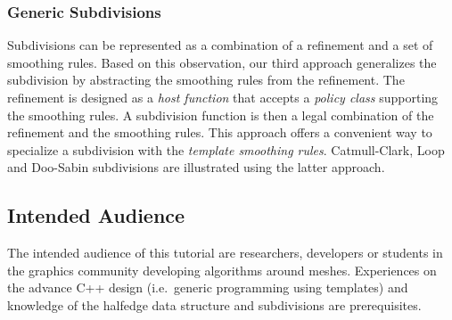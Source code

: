 \documentclass[letter]{article}
\begin{document}
\subsubsection*{Generic Subdivisions}
Subdivisions can be represented
as a combination of a refinement and a set of smoothing
rules. Based on this observation, our third approach 
generalizes the subdivision by abstracting the smoothing rules
from the refinement. The refinement is designed as a \emph{host 
function} that accepts a \emph{policy class} supporting the 
smoothing rules. A subdivision function is then a 
legal combination of the refinement and the smoothing rules.
This approach offers a convenient way to specialize a subdivision 
with the \emph{template smoothing rules}.
Catmull-Clark, Loop and Doo-Sabin
subdivisions are illustrated using the latter approach. 

\subsection*{Intended Audience}
The intended audience of this tutorial are researchers, 
developers or students in the graphics community developing 
algorithms around meshes. Experiences on the advance C++
design (i.e.\ generic programming using templates) and
knowledge of the halfedge data structure and 
subdivisions are prerequisites. 
\end{document}
